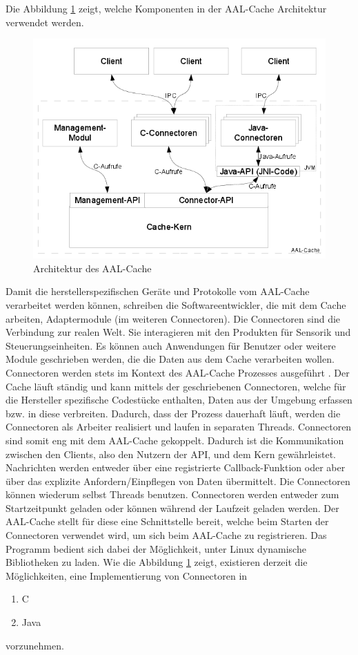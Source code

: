 Die Abbildung \ref{abb_aalcache} zeigt, welche Komponenten in der AAL-Cache Architektur verwendet werden.
\begin{figure}[h]
\includegraphics[scale=0.7]{images/aalcache}
\caption{Architektur des AAL-Cache}
\label{abb_aalcache}
\end{figure}

Damit die herstellerspezifischen Geräte und Protokolle vom AAL-Cache verarbeitet werden können, schreiben
die Softwareentwickler, die mit dem Cache arbeiten, Adaptermodule (im weiteren Connectoren).
Die Connectoren sind die Verbindung zur realen Welt.
Sie interagieren mit den Produkten für Sensorik und Steuerungseinheiten.
Es können auch Anwendungen für Benutzer oder weitere Module geschrieben werden,
die die Daten aus dem Cache verarbeiten wollen.
Connectoren werden stets im Kontext des AAL-Cache Prozesses ausgeführt \cite{aalcache}.
Der Cache läuft ständig und kann mittels der geschriebenen Connectoren, welche
für die Hersteller spezifische Codestücke enthalten, Daten aus der Umgebung erfassen bzw. in diese verbreiten.
Dadurch, dass der Prozess dauerhaft läuft, werden die Connectoren als Arbeiter realisiert und laufen in
separaten Threads.
Connectoren sind somit eng mit dem AAL-Cache gekoppelt.
Dadurch ist die Kommunikation zwischen den Clients, also den Nutzern der API, und dem Kern gewährleistet.
Nachrichten werden entweder über eine registrierte Callback-Funktion oder aber über das explizite
Anfordern/Einpflegen von Daten übermittelt.
Die Connectoren können wiederum selbst Threads benutzen.
Connectoren werden entweder zum Startzeitpunkt geladen oder können während der Laufzeit geladen werden.
Der AAL-Cache stellt für diese eine Schnittstelle bereit, welche beim Starten der Connectoren
verwendet wird, um sich beim AAL-Cache zu registrieren.
Das Programm bedient sich dabei der Möglichkeit, unter Linux dynamische Bibliotheken zu laden.
Wie die Abbildung \ref{abb_aalcache} zeigt, existieren derzeit die Möglichkeiten, eine Implementierung
von Connectoren in
\begin{enumerate}
\item C
\item Java
\end{enumerate}
vorzunehmen.

